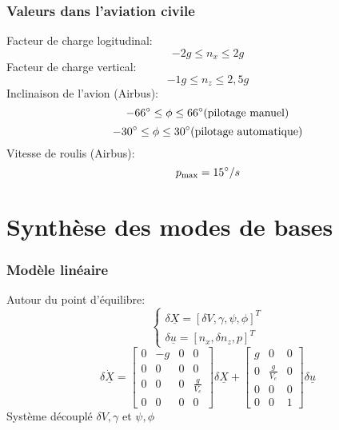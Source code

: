 \documentclass[tikz, footheight=2em]{beamer}
\begin{document}

\begin{frame}
    \frametitle{Valeurs dans l'aviation civile}\pause{}
    Facteur de charge logitudinal:
    \[
    -2g \le n_x \le 2g
    \]\pause{}
    Facteur de charge vertical:
    \[
    -1g \le n_z \le 2,5g
    \]\pause{}
    Inclinaison de l'avion (Airbus):
    \[
    -66\degree \le \phi \le 66\degree (\text{pilotage manuel})
    \]
    \[
    -30\degree \le \phi \le 30\degree (\text{pilotage automatique})
    \] \pause{}
    Vitesse de roulis (Airbus):
    \[
    p_{\max} = 15\degree /s
    \]
\end{frame}


\section{Synthèse des modes de bases}


\begin{frame}
    \frametitle{Modèle linéaire} \pause{}
    Autour du point d'équilibre:
    \[
    \left \{
    \begin{array}{c}
        \delta{} \underline{X} = {[\delta V, \gamma, \psi, \phi]}^{T} \\
        \delta{} \underline{u} = {[n_x, \delta n_z, p]}^{T}
    \end{array}
    \right.
    \]
    \[
    \delta \dot{\underline{X}}
    =
    \left[
    \begin{array}{cccc}
        0 & -g & 0 & 0 \\
        0 & 0 & 0 & 0 \\
        0 & 0 & 0 & \frac{g}{V_e} \\
        0 & 0 & 0 & 0
    \end{array}
    \right]
    \delta{} \underline{X}
    +
    \left[
    \begin{array}{cccc}
        g & 0 & 0 \\
        0 & \frac{g}{V_e} & 0 \\
        0 & 0 & 0 \\
        0 & 0 & 1
    \end{array}
    \right]
    \delta{} \underline{u}
    \] \pause{}
    Système découplé \( \delta V, \gamma \) et \( \psi, \phi \)
\end{frame}
\end{document}
